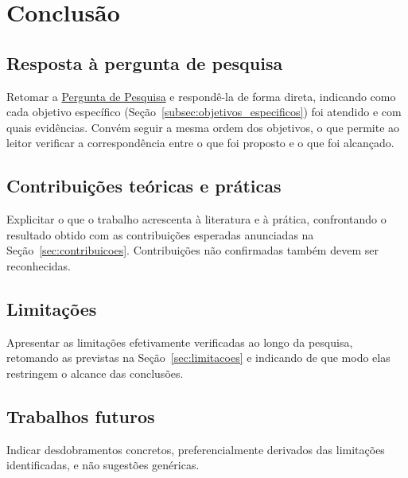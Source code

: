 \chapter{Conclusão}
\label{ch:conclusao}


\section{Resposta à pergunta de pesquisa}
\label{sec:resposta_pergunta}
Retomar a \hyperref[perg:principal]{Pergunta de Pesquisa} e respondê-la de forma direta, indicando como cada objetivo específico (Seção~\ref{subsec:objetivos_especificos}) foi atendido e com quais evidências. Convém seguir a mesma ordem dos objetivos, o que permite ao leitor verificar a correspondência entre o que foi proposto e o que foi alcançado.

\section{Contribuições teóricas e práticas}
\label{sec:contribuicoes_finais}
Explicitar o que o trabalho acrescenta à literatura e à prática, confrontando o resultado obtido com as contribuições esperadas anunciadas na Seção~\ref{sec:contribuicoes}. Contribuições não confirmadas também devem ser reconhecidas.

\section{Limitações}
\label{sec:limitacoes_finais}
Apresentar as limitações efetivamente verificadas ao longo da pesquisa, retomando as previstas na Seção~\ref{sec:limitacoes} e indicando de que modo elas restringem o alcance das conclusões.

\section{Trabalhos futuros}
\label{sec:trabalhos_futuros}
Indicar desdobramentos concretos, preferencialmente derivados das limitações identificadas, e não sugestões genéricas.

